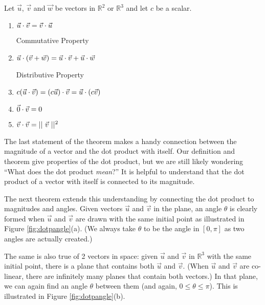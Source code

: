 {Let $\vec u$, $\vec v$ and $\vec w$ be vectors in $\mathbb{R}^2$ or $\mathbb{R}^3$ and let $c$ be a scalar.
\begin{enumerate}
	\item \parbox{150pt}{$\vec u \cdot \vec v = \vec v \cdot \vec u$}{Commutative Property}
	\item \parbox{150pt}{$\vec u\cdot(\vec v+\vec w) = \vec u \cdot \vec v + \vec u \cdot \vec w$}{Distributive Property}
	\item	$c(\vec u \cdot \vec v) = (c\vec u)\cdot \vec v = \vec u \cdot (c\vec v)$
	\item	$\vec 0 \cdot \vec v = 0$
	\item	$\vec v \cdot \vec v=||\ \vec v\ ||^2 $
\end{enumerate}
}

The last statement of the theorem makes a handy connection between the magnitude of a vector and the dot product with itself. 
Our definition and theorem give properties of the dot product, but we are still likely wondering ``What does the dot product \emph{mean}?'' It is helpful to understand that the dot product of a vector with itself is connected to its magnitude.

The next theorem extends this understanding by connecting the dot product to magnitudes and angles. Given vectors $\vec u$ and $\vec v$ in the plane, an angle $\theta$ is clearly formed when $\vec u$ and $\vec v$ are drawn with the same initial point as illustrated in Figure \ref{fig:dotpangle}(a). (We always take $\theta$ to be the angle in $[0,\pi]$ as two angles are actually created.) 

The same is also true of 2 vectors in space: given $\vec u$ and $\vec v$ in $\mathbb{R}^3$ with the same initial point, there is a plane that contains both $\vec u$ and $\vec v$. (When $\vec u$ and $\vec v$ are co-linear, there are infinitely many planes that contain both vectors.) In that plane, we can again find an angle $\theta$ between them (and again, $0\leq \theta\leq \pi$). This is illustrated in Figure \ref{fig:dotpangle}(b).

